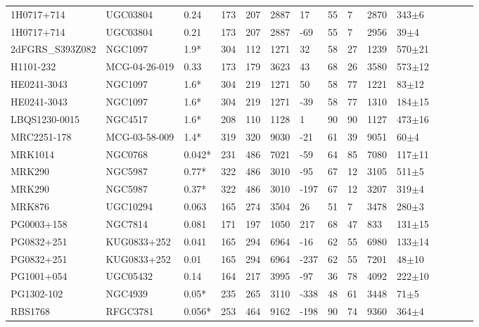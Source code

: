 \documentclass[iop]{emulateapj-rtx4}
\begin{document}
\begin{table}[ht]
\begin{center}
\begin{tabular}{l l l l l l l l l l l l l l l}
1H0717+714  &  UGC03804  &  0.24  &  173  &  207  &  2887  &  17  &  55  &  7  &  2870  &  343$\pm$6  \\
1H0717+714  &  UGC03804  &  0.21  &  173  &  207  &  2887  &  -69  &  55  &  7  &  2956  &  39$\pm$4  \\
2dFGRS\_S393Z082  &  NGC1097  &  1.9*  &  304  &  112  &  1271  &  32  &  58  &  27  &  1239  &  570$\pm$21  \\
H1101-232  &  MCG-04-26-019  &  0.33  &  173  &  179  &  3623  &  43  &  68  &  26  &  3580  &  573$\pm$12  \\
HE0241-3043  &  NGC1097  &  1.6*  &  304  &  219  &  1271  &  50  &  58  &  77  &  1221  &  83$\pm$12  \\
HE0241-3043  &  NGC1097  &  1.6*  &  304  &  219  &  1271  &  -39  &  58  &  77  &  1310  &  184$\pm$15  \\
LBQS1230-0015  &  NGC4517  &  1.6*  &  208  &  110  &  1128  &  1  &  90  &  90  &  1127  &  473$\pm$16  \\
MRC2251-178  &  MCG-03-58-009  &  1.4*  &  319  &  320  &  9030  &  -21  &  61  &  39  &  9051  &  60$\pm$4  \\
MRK1014  &  NGC0768  &  0.042*  &  231  &  486  &  7021  &  -59  &  64  &  85  &  7080  &  117$\pm$11  \\
MRK290  &  NGC5987  &  0.77*  &  322  &  486  &  3010  &  -95  &  67  &  12  &  3105  &  511$\pm$5  \\
MRK290  &  NGC5987  &  0.37*  &  322  &  486  &  3010  &  -197  &  67  &  12  &  3207  &  319$\pm$4  \\
MRK876  &  UGC10294  &  0.063  &  165  &  274  &  3504  &  26  &  51  &  7  &  3478  &  280$\pm$3  \\
PG0003+158  &  NGC7814  &  0.081  &  171  &  197  &  1050  &  217  &  68  &  47  &  833  &  131$\pm$15  \\
PG0832+251  &  KUG0833+252  &  0.041  &  165  &  294  &  6964  &  -16  &  62  &  55  &  6980  &  133$\pm$14  \\
PG0832+251  &  KUG0833+252  &  0.01  &  165  &  294  &  6964  &  -237  &  62  &  55  &  7201  &  48$\pm$10  \\
PG1001+054  &  UGC05432  &  0.14  &  164  &  217  &  3995  &  -97  &  36  &  78  &  4092  &  222$\pm$10  \\
PG1302-102  &  NGC4939  &  0.05*  &  235  &  265  &  3110  &  -338  &  48  &  61  &  3448  &  71$\pm$5  \\
RBS1768  &  RFGC3781  &  0.056*  &  253  &  464  &  9162  &  -198  &  90  &  74  &  9360  &  364$\pm$4  \\

\end{tabular}
\end{center}
\end{table}
\end{document}
